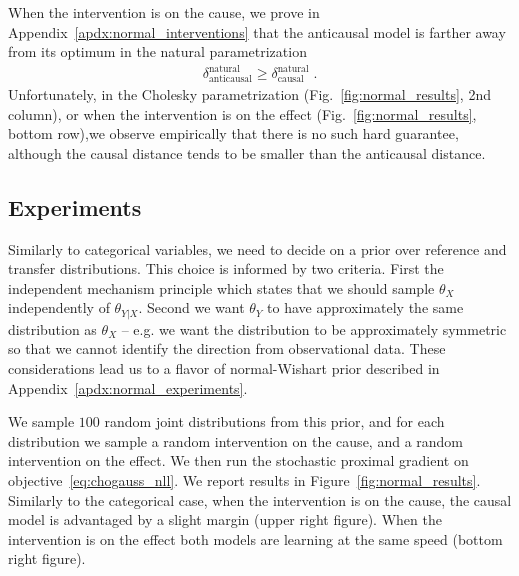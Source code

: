 When the intervention is on the cause, we prove in Appendix~\ref{apdx:normal_interventions} that the anticausal model is farther away from its optimum in the natural parametrization
\begin{align}
    \delta_\text{anticausal}^\text{natural} \geq  \delta_\text{causal}^\text{natural} \; . 
\end{align}
Unfortunately, in the Cholesky parametrization (Fig.~\ref{fig:normal_results}, 2nd column), or when the intervention is on the effect (Fig.~\ref{fig:normal_results}, bottom row),we observe empirically that there is no such hard guarantee, although the causal distance tends to be smaller than the anticausal distance.


\subsection{Experiments}
\label{ssec:normal_experiments}

Similarly to categorical variables, we need to decide on a prior over reference and transfer distributions. This choice is informed by two criteria.
First the independent mechanism principle which states that we should sample $\theta_X$ independently of $\theta_{Y|X}$.
Second we want $\theta_Y$ to have approximately the same distribution as $\theta_X$ 
-- e.g. we want the distribution to be approximately symmetric so that we cannot identify the direction from observational data. 
These considerations lead us to a flavor of normal-Wishart prior \citep{geiger2002parameter} described in Appendix~\ref{apdx:normal_experiments}.

We sample $100$ random joint distributions from this prior, and for each distribution we sample a random intervention on the cause, and a random intervention on the effect. We then run the stochastic proximal gradient on objective~\eqref{eq:chogauss_nll}. We report results in Figure~\ref{fig:normal_results}.
Similarly to the categorical case, when the intervention is on the cause, the causal model is advantaged by a slight margin (upper right figure). When the intervention is on the effect both models are learning at the same speed (bottom right figure).




